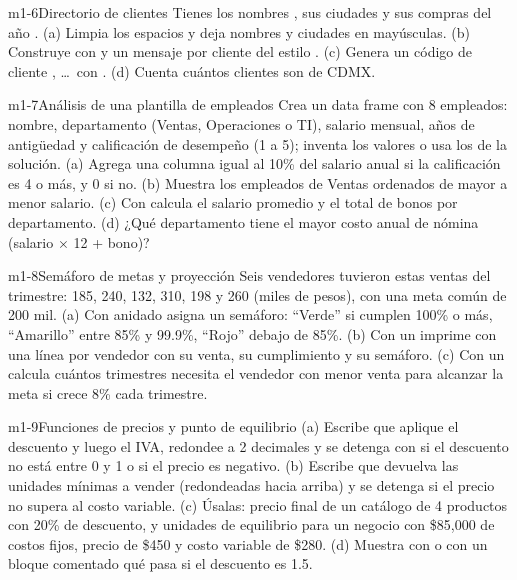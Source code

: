 \begin{ejercicio}{m1-6}{Directorio de clientes}
Tienes los nombres , sus ciudades  y sus
compras del año . (a) Limpia los
espacios y deja nombres y ciudades en mayúsculas. (b) Construye con
 y  un mensaje por cliente del
estilo . (c) Genera un
código de cliente , \ldots\ con
. (d) Cuenta cuántos clientes son de CDMX.
\end{ejercicio}

\begin{ejercicio}{m1-7}{Análisis de una plantilla de empleados}
Crea un data frame con 8 empleados: nombre, departamento (Ventas,
Operaciones o TI), salario mensual, años de antigüedad y calificación de
desempeño (1 a 5); inventa los valores o usa los de la solución. (a)
Agrega una columna  igual al 10\% del salario anual si la
calificación es 4 o más, y 0 si no. (b) Muestra los empleados de Ventas
ordenados de mayor a menor salario. (c) Con  calcula el
salario promedio y el total de bonos por departamento. (d) ¿Qué
departamento tiene el mayor costo anual de nómina (salario $\times$ 12 +
bono)?
\end{ejercicio}

\begin{ejercicio}{m1-8}{Semáforo de metas y proyección}
Seis vendedores tuvieron estas ventas del trimestre: 185, 240, 132, 310,
198 y 260 (miles de pesos), con una meta común de 200 mil. (a) Con
 anidado asigna un semáforo: ``Verde'' si cumplen 100\% o
más, ``Amarillo'' entre 85\% y 99.9\%, ``Rojo'' debajo de 85\%. (b) Con un
 imprime con  una línea por vendedor con su venta,
su cumplimiento y su semáforo. (c) Con un  calcula cuántos
trimestres necesita el vendedor con menor venta para alcanzar la meta si
crece 8\% cada trimestre.
\end{ejercicio}

\begin{ejercicio}{m1-9}{Funciones de precios y punto de equilibrio}
(a) Escribe  que
aplique el descuento y luego el IVA, redondee a 2 decimales y se detenga
con  si el descuento no está entre 0 y 1 o si el precio es
negativo. (b) Escribe  que devuelva las unidades mínimas a vender (redondeadas
hacia arriba) y se detenga si el precio no supera al costo variable. (c)
Úsalas: precio final de un catálogo de 4 productos con 20\% de descuento, y
unidades de equilibrio para un negocio con \$85,000 de costos fijos, precio
de \$450 y costo variable de \$280. (d) Muestra con  o
con un bloque comentado qué pasa si el descuento es 1.5.
\end{ejercicio}

